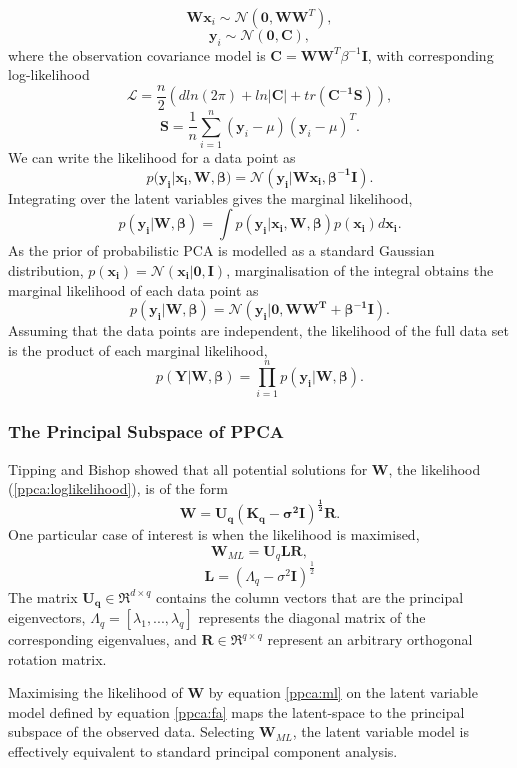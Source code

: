 \documentclass[ %
author={Dillon Keith Diep},
supervisor={Dr. Carl Henrik Ek},
degree={MEng},
title={ART-CG:},
subtitle={Assisted Real-time Content Generation of 3D Hair by Learning Manifolds},
type={Research},
year={2017} ]{dissertation}
\begin{document}
$$\bm{Wx}_i\sim\mathcal{N}(\bm{0},\bm{WW}^T),$$
$$\bm{y}_i\sim\mathcal{N}(\bm{0},\bm{C}),$$
where the observation covariance model is $\bm{C}=\bm{WW}^T\beta^{-1}\bm{I}$, with corresponding log-likelihood \cite{gplvm}
\begin{equation} \label{ppca:loglikelihood}
\mathcal{L}=\frac{n}{2}(d ln(2\pi)+ln|\bm{C}|+tr(\bm{C^{-1}S})),
\end{equation}
$$\bm{S}=\frac{1}{n}\sum^n_{i=1}(\bm{y}_i-\mu)(\bm{y}_i-\mu)^T.$$
We can write the likelihood for a data point as
\begin{equation} \label{ppca:likelihood}
p(\bm{y_i|x_i,W,\beta)=\mathcal{N}(y_i|Wx_i,\beta^{-1}I)}.
\end{equation}
Integrating over the latent variables gives the marginal likelihood,
$$p(\bm{y_i|W,\beta})=\int p(\bm{y_i|x_i,W,\beta})p(\bm{x_i})d\bm{x_i}.$$
As the prior of probabilistic PCA is modelled as a standard Gaussian distribution, $p(\bm{x_i})=\mathcal{N}(\bm{x_i|0,I})$,
marginalisation of the integral obtains the marginal likelihood of each data point as
$$p(\bm{y_i|W,\beta})=\mathcal{N}(\bm{y_i|0,WW^T+\beta^{-1}I}).$$
Assuming that the data points are independent, the likelihood of the full data set is the product of each marginal likelihood,
$$p(\bm{Y|W,\beta})=\prod^n_{i=1} p(\bm{y_i|W,\beta}).$$

\subsubsection{The Principal Subspace of PPCA}
Tipping and Bishop\cite{ppca} showed that all potential solutions for $\bm{W}$, the likelihood (\ref{ppca:loglikelihood}), is of the form $$\bm{W=U_q(K_q-\sigma^2I)^\frac{1}{2}R}.$$
One particular case of interest is when the likelihood is maximised,
\begin{equation} \label{ppca:ml}
\bm{W}_{ML}=\bm{U}_q\bm{LR},
\end{equation}
$$\bm{L}=(\Lambda_q-\sigma^2\bm{I})^{\frac{1}{2}}$$
The matrix $\bm{U_q}\in\Re^{d \times q}$ contains the column vectors that are the principal eigenvectors, $\Lambda_q=[\lambda_1,...,\lambda_q]$ represents the diagonal matrix of the corresponding eigenvalues, and $\bm{R}\in\Re^{q \times q}$ represent an arbitrary orthogonal rotation matrix. 

Maximising the likelihood of $\bm{W}$ by equation \ref{ppca:ml} on the latent variable model defined by equation \ref{ppca:fa} maps the latent-space to the principal subspace of the observed data. Selecting $\bm{W}_{ML}$, the latent variable model is effectively equivalent to standard principal component analysis.
\end{document}
